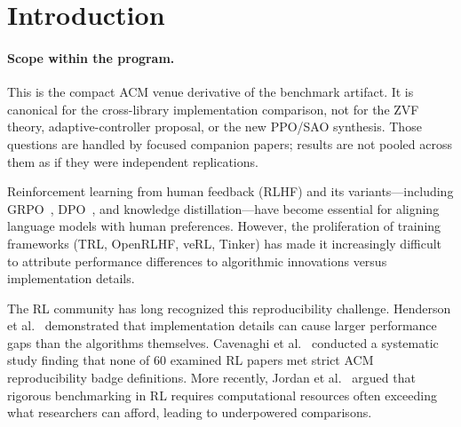 \documentclass[manuscript,review,anonymous]{acmart}
\begin{document}
\section{Introduction}
\label{sec:intro}


\paragraph{Scope within the program.}
This is the compact ACM venue derivative of the benchmark artifact. It is
canonical for the cross-library implementation comparison, not for the ZVF
theory, adaptive-controller proposal, or the new PPO/SAO synthesis. Those
questions are handled by focused companion papers; results are not pooled across
them as if they were independent replications.

Reinforcement learning from human feedback (RLHF) and its variants---including
GRPO~\cite{shao2024deepseekmath}, DPO~\cite{rafailov2024direct}, and knowledge
distillation---have become essential for aligning language models with human
preferences. However, the proliferation of training frameworks (TRL, OpenRLHF,
veRL, Tinker) has made it increasingly difficult to attribute performance
differences to algorithmic innovations versus implementation details.

The RL community has long recognized this reproducibility challenge.
Henderson et al.~\cite{henderson2018deep} demonstrated that implementation
details can cause larger performance gaps than the algorithms themselves.
Cavenaghi et al.~\cite{cavenaghi2023systematic} conducted a systematic study
finding that none of 60 examined RL papers met strict ACM reproducibility
badge definitions. More recently, Jordan et al.~\cite{jordan2024benchmarking}
argued that rigorous benchmarking in RL requires computational resources often
exceeding what researchers can afford, leading to underpowered comparisons.
\end{document}

